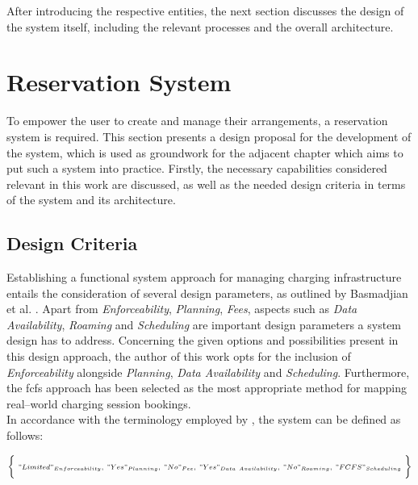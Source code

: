 \noindent After introducing the respective entities, the next section discusses the design of the system itself, including the relevant processes and the overall architecture.

\newpage

\section{Reservation System}
\label{ch:Design:sec:Reservation System}

To empower the user to create and manage their arrangements, a reservation system is required. This section presents a design proposal for the development of the system, which is used as groundwork for the adjacent chapter which aims to put such a system into practice. Firstly, the necessary capabilities considered relevant in this work are discussed, as well as the needed design criteria in terms of the system and its architecture.

\subsection{Design Criteria}
\label{ch:Design:sec:Reservation System:ssec:Design Criteria}

Establishing a functional system approach for managing charging infrastructure entails the consideration of several design parameters, as outlined by Basmadjian et al. \cite{basmadjian_reference_2020}. Apart from \textit{Enforceability}, \textit{Planning}, \textit{Fees}, aspects such as \textit{Data Availability}, \textit{Roaming} and \textit{Scheduling} are important design parameters a system design has to address.
Concerning the given options and possibilities present in this design approach, the author of this work opts for the inclusion of \textit{Enforceability} alongside \textit{Planning}, \textit{Data Availability} and \textit{Scheduling}.
Furthermore, the \acrshort{fcfs} approach has been selected as the most appropriate method for mapping real--world charging session bookings.\\
\noindent In accordance with the terminology employed by \cite{basmadjian_reference_2020}, the system can be defined as follows:

\begin{eqnarray*}
\scriptstyle \biggl\{\ "Limited"_{Enforceability},\ "Yes"_{Planning},\ "No"_{Fee},\ "Yes"_{Data\ Availability},\ "No"_{Roaming},\ "FCFS"_{Scheduling}\ \biggr\}
\end{eqnarray*}

